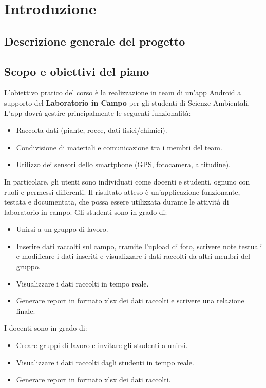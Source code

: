 \section{Introduzione}

\subsection{Descrizione generale del progetto}

\subsection{Scopo e obiettivi del piano}
L'obiettivo pratico del corso è la realizzazione in team di un'app Android a supporto del \textbf{Laboratorio in Campo} per gli studenti di Scienze Ambientali. 
L'app dovrà gestire principalmente le seguenti funzionalità:
\begin{itemize}
    \item Raccolta dati (piante, rocce, dati fisici/chimici).
    \item Condivisione di materiali e comunicazione tra i membri del team.
    \item Utilizzo dei sensori dello smartphone (GPS, fotocamera, altitudine).
\end{itemize}


In particolare, gli utenti sono individuati come docenti e studenti, ognuno con ruoli e permessi differenti. Il risultato atteso è un'applicazione funzionante, testata e documentata, che possa essere utilizzata durante le attività di laboratorio in campo.
Gli studenti sono in grado di:
\begin{itemize}
    \item Unirsi a un gruppo di lavoro.
    \item Inserire dati raccolti sul campo, tramite l'upload di foto, scrivere note testuali e modificare i dati inseriti e visualizzare i dati raccolti da altri membri del gruppo.
    \item Visualizzare i dati raccolti in tempo reale.
    \item Generare report in formato xlsx dei dati raccolti e scrivere una relazione finale.
\end{itemize}


I docenti sono in grado di:
\begin{itemize}
    \item Creare gruppi di lavoro e invitare gli studenti a unirsi.
    \item Visualizzare i dati raccolti dagli studenti in tempo reale.
    \item Generare report in formato xlsx dei dati raccolti.

\end{itemize}

